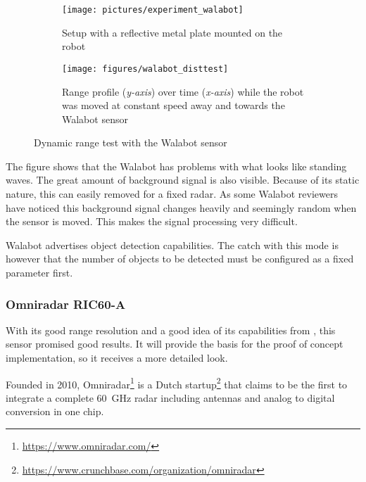 \begin{figure}[htbp]
    \centering


    \begin{subfigure}[t]{0.2618405121\textwidth}
        \texttt{[image: pictures/experiment\_walabot]}
        \caption{Setup with a reflective metal plate mounted on the robot}
        \label{fig:walabot_dynamic_setup}
    \end{subfigure}%
    \hfill%
    \begin{subfigure}[t]{0.68815948789\textwidth}
        \texttt{[image: figures/walabot\_disttest]}
        \caption{Range profile (\textit{y-axis}) over time (\textit{x-axis}) while the robot was moved at constant speed away and towards the Walabot sensor}
        \label{fig:walabot_dynamic_data}
    \end{subfigure}%
    \caption{Dynamic range test with the Walabot sensor}
\end{figure}

The figure shows that the Walabot has problems with what looks like
standing waves. The great amount of background signal is also visible.
Because of its static nature, this can easily removed for a fixed radar.
As some Walabot reviewers have noticed \cite{Valens2016} this background
signal changes heavily and seemingly random when the sensor is moved.
This makes the signal processing very difficult.

Walabot advertises object detection capabilities. The catch with this
mode is however that the number of objects to be detected must be
configured as a fixed parameter first.

\subsubsection{Omniradar RIC60-A}\label{omniradar}

With its good range resolution and a good idea of its capabilities from \cite{Ernst2016}, this sensor promised good results. It will provide the basis for the proof of concept implementation, so it receives a more detailed look.

Founded in 2010, Omniradar\footnote{\url{https://www.omniradar.com/}} is a Dutch
startup\footnote{\url{https://www.crunchbase.com/organization/omniradar}} that
claims to be the first to integrate a complete \SI{60}{GHz} radar including
antennas and analog to digital conversion in one chip.

